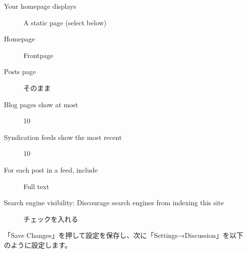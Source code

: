 \documentclass[titlepage,10pt,a4paper,uplatex]{jsbook}
\begin{document}
\begin{description}
\item[Your homepage displays] A static page (select below)
\item[Homepage] Frontpage
\item[Posts page] そのまま
\item[Blog pages show at most] 10
\item[Syndication feeds show the most recent] 10
\item[For each post in a feed, include] Full text
\item[Search engine visibility: Discourage search engines from indexing this site] チェックを入れる
\end{description}

「Save Changes」を押して設定を保存し、次に「Settings→Discussion」を以下のように設定します。
\end{document}
